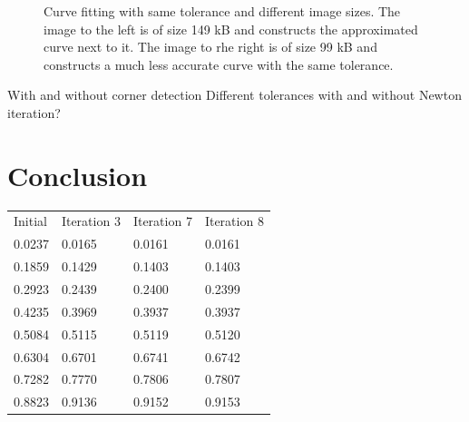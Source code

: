 \documentclass[10pt]{article}
\begin{document}
\begin{figure}
\begin{minipage}[t]{.24\textwidth}
    \label{fig:cornerdet}
\end{minipage}\hfill
\caption{Curve fitting with same tolerance and different image sizes. The image to the left is of size 149 kB and constructs the approximated curve next to it. The image to rhe right is of size 99 kB and constructs a much less accurate curve with the same tolerance.}
\label{fig:mickey}
\end{figure}




With and without corner detection
Different tolerances
with and without Newton iteration?





\section{Conclusion}
\cite{Plass:1983}




\begin{tabular}{ l l l l }
  Initial & Iteration 3 & Iteration 7 & Iteration 8 \\ 
  0.0237 & 0.0165 & 0.0161 & 0.0161 \\
  0.1859 & 0.1429 & 0.1403 & 0.1403 \\ 
  0.2923 & 0.2439 & 0.2400 & 0.2399 \\ 
  0.4235 & 0.3969 & 0.3937 & 0.3937 \\ 
  0.5084 & 0.5115 & 0.5119 & 0.5120 \\ 
  0.6304 & 0.6701 & 0.6741 & 0.6742 \\ 
  0.7282 & 0.7770 & 0.7806 & 0.7807 \\ 
  0.8823 & 0.9136 & 0.9152 & 0.9153 \\ 
\end{tabular}
\end{document}
